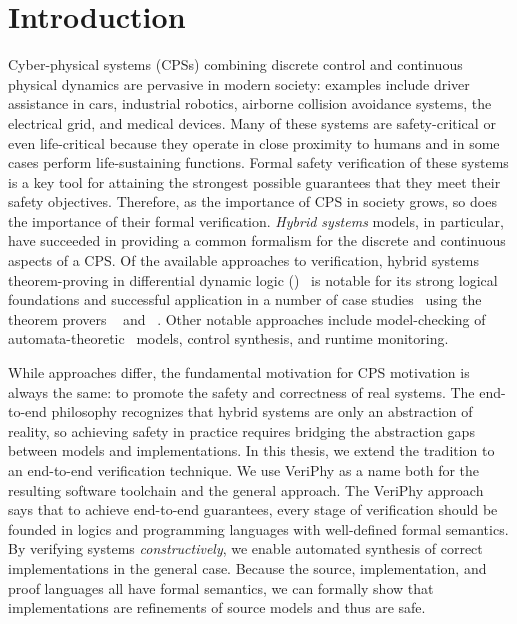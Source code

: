 \documentclass[12pt]{cmuthesis}
\theoremstyle{definition}
\theoremstyle{remark}
\newcommand{\VeriPhy}{VeriPhy\xspace}
\begin{document}
\chapter{Introduction}
\label{ch:introduction}
Cyber-physical systems (CPSs) combining discrete control and continuous physical dynamics are pervasive in modern society: examples include driver assistance in cars, industrial robotics, airborne collision avoidance systems, the electrical grid, and medical devices.
Many of these systems are safety-critical or even life-critical because they operate in close proximity to humans and in some cases perform life-sustaining functions.
Formal safety verification of these systems is a key tool for attaining the strongest possible guarantees that they meet their safety objectives.
Therefore, as the importance of CPS in society grows, so does the importance of their formal verification.
\emph{Hybrid systems} models, in particular, have succeeded in providing a common formalism for the discrete and continuous aspects of a CPS.
Of the available approaches to verification, hybrid systems theorem-proving in differential dynamic logic (\dL)~\cite{Platzer18,DBLP:journals/jar/Platzer08,DBLP:journals/jar/Platzer17,DBLP:conf/lics/Platzer12b:TR} is notable for its strong logical foundations and successful application in a number of case studies~\cite{DBLP:conf/emsoft/JeanninGKGSZP15,DBLP:conf/fm/LoosPN11,DBLP:conf/rss/MitschGP13,DBLP:conf/hybrid/PlatzerQ08} using the theorem provers \KeYmaera~\cite{DBLP:conf/cade/PlatzerQ08} and \KeYmaeraX~\cite{DBLP:conf/cade/FultonMQVP15}.
Other notable approaches include model-checking of automata-theoretic~\cite{DBLP:conf/lics/Henzinger96} models, control synthesis, and runtime monitoring.

While approaches differ, the fundamental motivation for CPS motivation is always the same: to promote the safety and correctness of real systems.
The end-to-end philosophy recognizes that hybrid systems are only an abstraction of reality, so achieving safety in practice requires bridging the abstraction gaps between models and implementations.
In this thesis, we extend the \dL tradition to an end-to-end verification technique.
We use \VeriPhy as a name both for the resulting software toolchain and the general approach.
The \VeriPhy approach says that to achieve end-to-end guarantees, every stage of verification should be founded in logics and programming languages with well-defined formal semantics.
By verifying systems \emph{constructively}, we enable automated synthesis of correct implementations in the general case.
Because the source, implementation, and proof languages all have formal semantics, we can formally show that implementations are refinements of source models and thus are safe.
\end{document}
